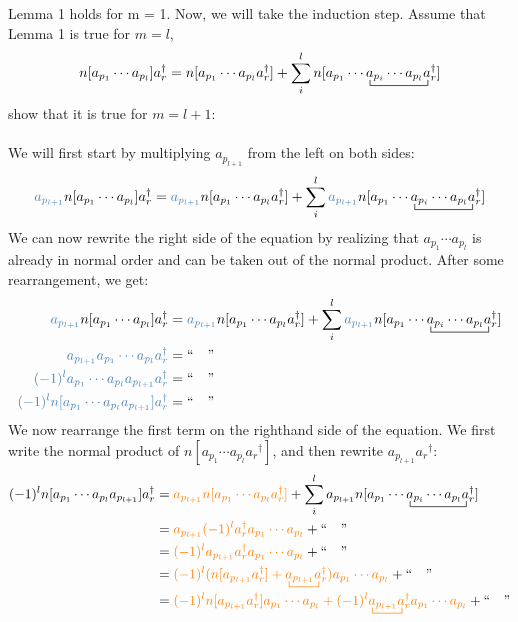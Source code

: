 \documentclass{article}
\newcommand{\ctr}{\bcontraction}
\newcommand{\dg}{\ensuremath{^\dagger} }
\newcommand{\cd}{\ensuremath{\cdots} }
\def\cb#1{{\color{blue}#1}}
\def\co#1{{\color{orange}#1}}
\begin{document}
Lemma 1 holds for m = 1. Now, we will take the induction step.
Assume that Lemma 1 is true for $m = l$, 
\[n[a_{p_1} \cd a_{p_l}]a_r\dg = n[a_{p_1} \cd a_{p_l} a_r\dg] + \sum_i^l n[\ctr{a_{p_1} \cd}{a}{{}_{p_i} \cd a_{p_l}}{a} a_{p_1} \cd a_{p_i} \cd a_{p_l} a_r\dg]\]
show that it is true for $m=l+1$:  \\ \\
We will first start by multiplying $a_{p_{l+1}}$ from the left on both sides: 
\[\cb{a_{p_{l + 1}}} n[a_{p_1} \cd a_{p_l}]a_r\dg = \cb{a_{p_{l + 1}}} n[a_{p_1} \cd a_{p_l} a_r\dg] + \sum_i^l \cb{a_{p_{l + 1}}}  n[\ctr{a_{p_1} \cd}{a}{{}_{p_i} \cd a_{p_l}}{a} a_{p_1} \cd a_{p_i} \cd a_{p_l} a_r\dg]\]
We can now rewrite the right side of the equation by realizing that $a_{p_1} \cd a_{p_l}$ is already in normal order and can be taken out of the normal product. 
After some rearrangement, we get: 
\begin{align*}
\cb{a_{p_{l + 1}}} n[a_{p_1} \cd a_{p_l}]a_r\dg &= \cb{a_{p_{l + 1}}} n[a_{p_1} \cd a_{p_l} a_r\dg] + \sum_i^l \cb{a_{p_{l + 1}}}  n[\ctr{a_{p_1} \cd}{a}{{}_{p_i} \cd a_{p_l}}{a} a_{p_1} \cd a_{p_i} \cd a_{p_l} a_r\dg] \\
\cb{a_{p_{l + 1}}a_{p_1} \cd a_{p_l} a_r\dg } &= ``\quad " \\%
\cb{(-1)^l a_{p_1} \cd a_{p_l} a_{p_{l + 1}} a_r\dg } &=  ``\quad "\\%
\cb{(-1)^l n[a_{p_1} \cd a_{p_l} a_{p_{l + 1}} ]a_r\dg } &=  ``\quad "  \\
\end{align*}
We now rearrange the first term on the righthand side of the equation.
We first write the normal product of $n[a_{p_1} \cd a_{p_l} a_r\dg]$, and then rewrite $a_{p_{l + 1}} a_r\dg$:
\begin{align*}
(-1)^l n[a_{p_1} \cd a_{p_l} a_{p_{l + 1}} ]a_r\dg &= \co{a_{p_{l + 1}} n[a_{p_1} \cd a_{p_l} a_r\dg] }+ \sum_i^l a_{p_{l + 1}}  n[\ctr{a_{p_1} \cd}{a}{{}_{p_i} \cd a_{p_l}}{a} a_{p_1} \cd a_{p_i} \cd a_{p_l} a_r\dg] \\
&= \co{ a_{p_{l + 1}} (-1)^l  a_r\dg a_{p_1} \cd a_{p_l}} +  ``\quad" \\
&= \co{  (-1)^l  a_{p_{l + 1}} a_r\dg a_{p_1} \cd a_{p_l}} +  ``\quad" \\
&= \co{  (-1)^l ( n[a_{p_{l + 1}} a_r\dg] + \ctr{}{a}{{}_{p_{l + 1}}}{a} a_{p_{l + 1}} a_r\dg)  a_{p_1} \cd a_{p_l}} +  ``\quad" \\
&= \co{  (-1)^l  n[a_{p_{l + 1}} a_r\dg] a_{p_1} \cd a_{p_l}+  (-1)^l \ctr{}{a}{{}_{p_{l + 1}}}{a} a_{p_{l + 1}} a_r\dg a_{p_1} \cd a_{p_l}} +  ``\quad" \\
\end{align*} 
\end{document}
